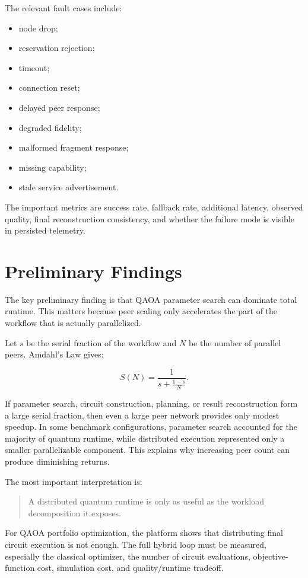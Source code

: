 \documentclass[11pt]{article}
\begin{document}
The relevant fault cases include:

\begin{itemize}
\item node drop;
\item reservation rejection;
\item timeout;
\item connection reset;
\item delayed peer response;
\item degraded fidelity;
\item malformed fragment response;
\item missing capability;
\item stale service advertisement.
\end{itemize}

The important metrics are success rate, fallback rate, additional latency, observed quality, final reconstruction consistency, and whether the failure mode is visible in persisted telemetry.

\section{Preliminary Findings}

The key preliminary finding is that QAOA parameter search can dominate total runtime. This matters because peer scaling only accelerates the part of the workflow that is actually parallelized.

Let \(s\) be the serial fraction of the workflow and \(N\) be the number of parallel peers. Amdahl's Law gives:

\[
S(N)=\frac{1}{s+\frac{1-s}{N}}.
\]

If parameter search, circuit construction, planning, or result reconstruction form a large serial fraction, then even a large peer network provides only modest speedup. In some benchmark configurations, parameter search accounted for the majority of quantum runtime, while distributed execution represented only a smaller parallelizable component. This explains why increasing peer count can produce diminishing returns.

The most important interpretation is:

\begin{quote}
A distributed quantum runtime is only as useful as the workload decomposition it exposes.
\end{quote}

For QAOA portfolio optimization, the platform shows that distributing final circuit execution is not enough. The full hybrid loop must be measured, especially the classical optimizer, the number of circuit evaluations, objective-function cost, simulation cost, and quality/runtime tradeoff.
\end{document}
